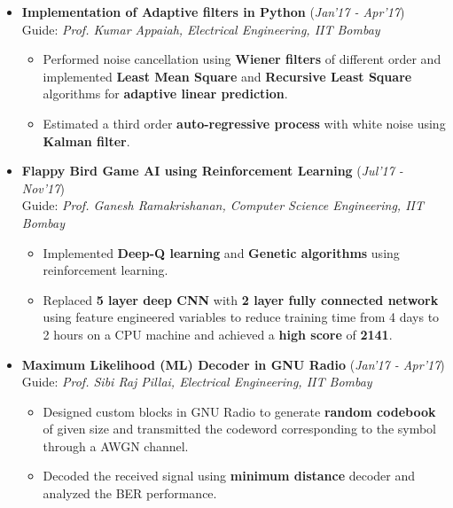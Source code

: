 \documentclass[10pt]{article}
\begin{document}
\begin{itemize}[leftmargin=0.4cm]
	\vspace{-0.2cm}
	
\item \textbf{Implementation of Adaptive filters in Python}
\hfill{(\textit{Jan'17 - Apr'17})}\\
Guide: \textit{Prof. Kumar Appaiah, Electrical Engineering, IIT Bombay}\\\vspace{-0.68cm}
    \begin{itemize}
    \item Performed noise cancellation using \textbf{Wiener filters} of different order and implemented \textbf{Least Mean Square} and \textbf{Recursive Least Square} algorithms for \textbf{adaptive linear prediction}.\vspace{-0.1cm}
    \item Estimated a third order \textbf{auto-regressive process} with white noise using \textbf{Kalman filter}. 
    \end{itemize}
    \vspace{-0.2cm}

\item \textbf{Flappy Bird Game AI using Reinforcement Learning}
\hfill{(\textit{Jul'17 - Nov'17})}\\
Guide: \textit{Prof. Ganesh Ramakrishanan, Computer Science Engineering, IIT Bombay}\\\vspace{-0.68cm}
	\begin{itemize}
	\item Implemented \textbf{Deep-Q learning} and \textbf{Genetic algorithms} using reinforcement learning.\vspace{-0.1cm}
	\item Replaced \textbf{5 layer deep CNN} with \textbf{2 layer fully connected network} using feature engineered variables to reduce training time from 4 days to 2 hours on a CPU machine and achieved a \textbf{high score} of \textbf{2141}.
	\end{itemize}
	\vspace{-0.2cm}	
	
	
\item \textbf{Maximum Likelihood (ML) Decoder in  GNU Radio}
\hfill{(\textit{Jan'17 - Apr'17})}\\
Guide: \textit{Prof. Sibi Raj Pillai, Electrical Engineering, IIT Bombay}\\\vspace{-0.68cm}	
\begin{itemize}
		\item Designed custom blocks in GNU Radio to generate \textbf{random codebook} of given size and transmitted the codeword corresponding to the symbol through a AWGN channel.\vspace{-0.1cm}
		\item Decoded the received signal using \textbf{minimum distance} decoder and analyzed the BER performance.
    \end{itemize}	
    \vspace{-0.2cm}


\end{itemize}
\end{document}
